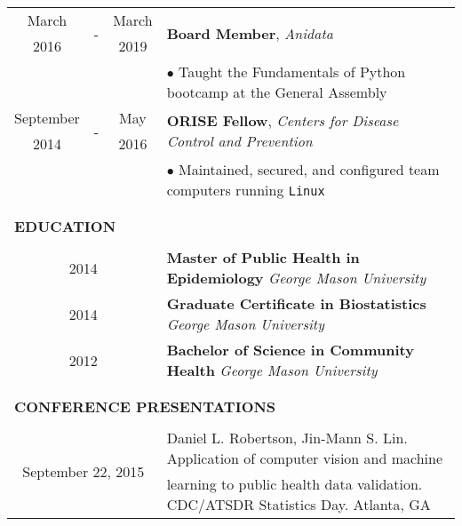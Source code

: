 \documentclass[10pt]{article}
\begin{document}
\begin{table}[ht]
\begin{tabular}{@{\hspace{0mm}}c@{\hspace{1mm}}c@{\hspace{3mm}}cl}
            March & \multirow{2}{*}{-} & March & \multirow{2}{*}{\textbf{Board Member}, \textit{Anidata}}\\
            2016 & & 2019 &\\
            & & & $\bullet$ Taught the Fundamentals of Python bootcamp at the General Assembly\\
            September & \multirow{2}{*}{-} & May & \multirow{2}{*}{\textbf{ORISE Fellow}, \textit{Centers for Disease Control and Prevention}}\\
            2014 & & 2016 &\\
            & & & $\bullet$ Maintained, secured, and configured team computers running \texttt{Linux}\\\\[-2mm]
            \hline\\[-3mm]
            \multicolumn{4}{l}{\large{\textbf{EDUCATION}}}\\
            \hline\\[-2mm]
            \multicolumn{3}{c}{2014} & \textbf{Master of Public Health in Epidemiology} \textit{George Mason University}\\[1mm]
            \multicolumn{3}{c}{2014} & \textbf{Graduate Certificate in Biostatistics} \textit{George Mason University}\\[1mm]
            \multicolumn{3}{c}{2012} & \textbf{Bachelor of Science in Community Health} \textit{George Mason University}\\\\[-2mm]
            \hline\\[-3mm]
            \multicolumn{4}{l}{\large{\textbf{CONFERENCE PRESENTATIONS}}}\\
            \hline\\[-2mm]
            \multicolumn{3}{c}{\multirow{2}{*}{September 22, 2015}} & Daniel L. Robertson, Jin-Mann S. Lin. Application of computer vision and machine\\
            & & & learning to public health data validation. CDC/ATSDR Statistics Day. Atlanta, GA\\
        \end{tabular}
    \end{table}
\end{document}
